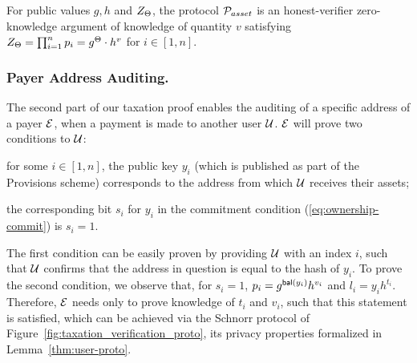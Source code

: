 

\begin{lemma}\label{thm:tax-auth-proto}
    For public values $g, h$ and $Z_\Theta$, the protocol $\mathcal{P}_{asset}$ is an
    honest-verifier zero-knowledge argument of knowledge of quantity $v$
    satisfying
    $Z_\Theta = \prod_{i = 1}^n p_i = g^{\Theta} \cdot h^v$ for $i \in [1, n]$.
\end{lemma}

\subsubsection*{Payer Address Auditing.}\label{subsec:user-verification-proto}
The second part of our taxation proof enables the auditing of a specific
address of a payer $\mathcal{E}$, when a payment is made to another
user $\mathcal{U}$. $\mathcal{E}$ will prove two conditions to $\mathcal{U}$:
\begin{inparaenum}[i)]
    \item for some $i \in [1, n]$, the public key $y_i$ (which is published as
        part of the Provisions scheme) corresponds to the address from which
        $\mathcal{U}$ receives their assets;
    \item the corresponding bit $s_i$ for $y_i$ in the commitment condition
        (\ref{eq:ownership-commit}) is $s_i = 1$.
\end{inparaenum}
The first condition can be easily proven by providing $\mathcal{U}$ with an index
$i$, such that $\mathcal{U}$ confirms that the address in question is equal to the
hash of $y_i$. To prove the second condition, we observe that, for $s_i = 1$,
$p_i = g^{\mathsf{bal}(y_i)}h^{v_i}$ and
$l_i = y_ih^{t_i}$.
Therefore, $\mathcal{E}$ needs only to prove knowledge of $t_i$ and $v_i$, such that this
statement is satisfied, which can be achieved via the Schnorr protocol
of Figure~\ref{fig:taxation_verification_proto}, its privacy properties formalized in
Lemma~\ref{thm:user-proto}.

